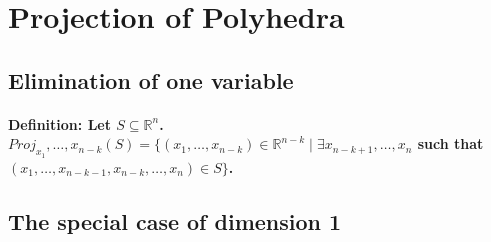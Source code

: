 \documentclass[main]{subfiles}
\begin{document}

\section{Projection of Polyhedra}

\subsection{Elimination of one variable}
\paragraph{Definition: Let $ S \subseteq \mathbb{R}^{n}$. $Proj_{x_{1}}, \dots, x_{n-k} (S) = \{ (x_{1}, \dots, x_{n-k}) \in \mathbb{R}^{n-k} \mid \exists x_{n-k+1}, \dots, x_{n}$ such that $(x_{1}, \dots, x_{n-k -1}, x_{n-k}, \dots, x_{n}) \in S \}$.}

\subsection{The special case of dimension 1}
\end{document}
